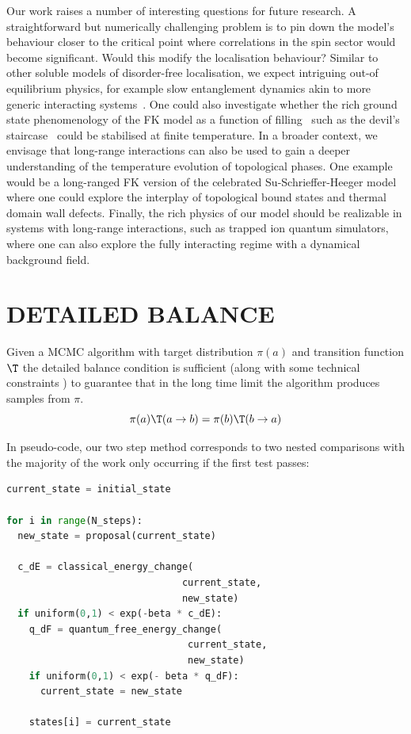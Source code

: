 Our work raises a number of interesting questions for future research. 
A straightforward but numerically challenging problem is to pin down the model's behaviour closer to the critical point where correlations in the spin sector would become significant. Would this modify the localisation behaviour? Similar to other soluble models of disorder-free localisation, we expect intriguing out-of equilibrium physics, for example slow entanglement dynamics akin to more generic interacting systems~\cite{hartLogarithmicEntanglementGrowth2020}. One could also investigate whether the rich ground state phenomenology of the FK model as a function of filling~\cite{gruberGroundStatesSpinless1990} such as the devil's staircase~\cite{michelettiCompleteDevilTextquotesingles1997} could be stabilised at finite temperature. In a broader context, we envisage that long-range interactions can also be used to gain a deeper understanding of the temperature evolution of topological phases. One example would be a long-ranged \ac{FK} version of the celebrated Su-Schrieffer-Heeger model where one could explore the interplay of topological bound states and thermal domain wall defects. Finally, the rich physics of our model should be realizable in systems with long-range interactions, such as trapped ion quantum simulators, where one can also explore the fully interacting regime with a dynamical background field.  

\section{\label{app:balance}
DETAILED BALANCE
}
Given a \ac{MCMC} algorithm with target distribution \(\pi(a)\) and transition function \(\T\) the detailed balance condition is sufficient (along with some technical constraints \cite{wolffMonteCarloErrors2004}) to guarantee that in the long time limit the algorithm produces samples from \(\pi\). 
\[\pi(a)\T(a \to b) = \pi(b)\T(b \to a)\]

In pseudo-code, our two step method corresponds to two nested comparisons with the majority of the work only occurring if the first test passes:

\begin{lstlisting}[language=Python]
current_state = initial_state

for i in range(N_steps):
  new_state = proposal(current_state)

  c_dE = classical_energy_change(
                               current_state,
                               new_state)
  if uniform(0,1) < exp(-beta * c_dE):
    q_dF = quantum_free_energy_change(
                                current_state,
                                new_state)
    if uniform(0,1) < exp(- beta * q_dF):
      current_state = new_state

    states[i] = current_state
\end{lstlisting}

